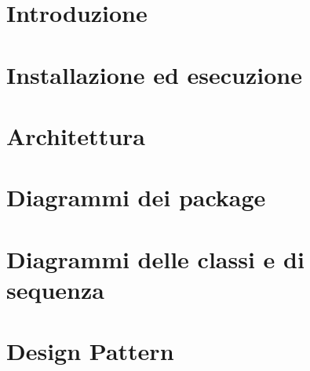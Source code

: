 \documentclass[a4paper, oneside, openany, dvipsnames, table]{article}
\begin{document}
\copertina{} 

\newpage
\tableofcontents
\newpage
\listoffigures
\newpage
\listoftables
\newpage

\section{Introduzione}

\newpage
\section{Installazione ed esecuzione}

\newpage
\section{Architettura}

\newpage
\section{Diagrammi dei package}

\newpage
\section{Diagrammi delle classi e di sequenza}

\newpage
\section{Design Pattern}

\end{document}
